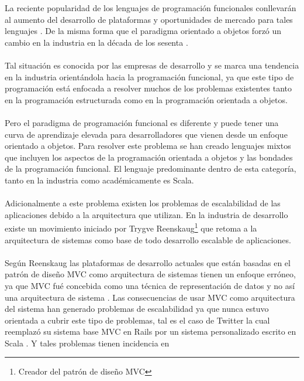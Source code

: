   La reciente popularidad de los lenguajes de programaci\'on funcionales
  conllevar\'an al aumento del desarrollo de plataformas y oportunidades de mercado 
  para tales lenguajes \citep{scalaPotentialUk}. De la misma forma que el paradigma orientado a 
  objetos forz\'o un cambio en la industria en la d\'ecada de los sesenta  \citep{roadStructuredToOO}.
\\ 
\\
  Tal situaci\'on es conocida por las empresas de desarrollo y se marca
  una tendencia en la industria orient\'andola hacia la
  programaci\'on funcional, ya que este tipo de programaci\'on est\'a
  enfocada a resolver muchos de los problemas existentes tanto en 
  la programaci\'on estructurada como en la programaci\'on orientada 
  a objetos.
\\ 
\\ 
  Pero el paradigma de programaci\'on funcional es diferente y puede
  tener una curva de aprendizaje elevada para desarrolladores que
  vienen desde un enfoque orientado a objetos. Para resolver este
  problema se han creado lenguajes mixtos que incluyen los aspectos
  de la programaci\'on orientada a objetos y las bondades de la
  programaci\'on funcional. El lenguaje predominante dentro de esta
  categor\'ia, tanto en la industria como acad\'emicamente es
  Scala\citep{scalaIntro}.
\\ 
\\ 
  Adicionalmente a este problema existen los problemas de
  escalabilidad de las aplicaciones debido a la arquitectura que
  utilizan.  En la industria de desarrollo existe un movimiento
  iniciado por Trygve Reenskaug\footnote{Creador del patr\'on de
    dise\~no MVC} que retoma a la arquitectura de sistemas como base
  de todo desarrollo escalable de aplicaciones.
\\ 
\\
  Seg\'un Reenskaug las plataformas de desarrollo actuales que est\'an
  basadas en el patr\'on de dise\~no \gls{MVC} como arquitectura de sistemas
  tienen un enfoque err\'oneo, ya que \gls{MVC} fu\'e concebida como una
  t\'ecnica de representaci\'on de datos y no as\'i una arquitectura
  de sistema \citep{dciIntro}. Las consecuencias de usar \gls{MVC} como arquitectura 
  del sistema han generado problemas de escalabilidad ya que nunca estuvo 
  orientada a cubrir este tipo de problemas, tal es el caso de Twitter 
  la cual reemplaz\'o su sistema base \gls{MVC} en Rails por un sistema personalizado 
  escrito en Scala \citep{twitterScala}. Y tales problemas tienen incidencia en 
